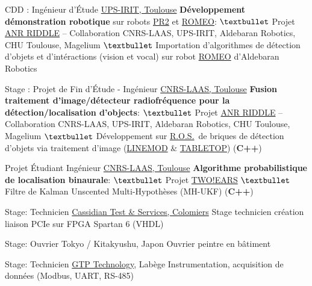 \documentclass[
	a4paper,
]{fortysecondscv}
\newcommand{\ros}{\href{http://www.ros.org/}{R.O.S.}}
\begin{document}
\begin{cvtable}[2]
  {CDD : Ingénieur d'Étude}
  {\href{https://www.irit.fr/?lang=fr}{UPS-IRIT, Toulouse}}
  {
    \textbf{Développement démonstration robotique} sur robots
    \href{http://www.willowgarage.com/pages/pr2/overview}{PR2} et
    \href{https://spectrum.ieee.org/automaton/robotics/humanoids/aldebaran-robotics-introduces-romeo-finally}{ROMEO}:\newline
    $\textbullet$ Projet
    \href{http://www.agence-nationale-recherche.fr/Project-ANR-12-CORD-0003}{ANR
      RIDDLE} -- Collaboration CNRS-LAAS, UPS-IRIT, Aldebaran Robotics, CHU
    Toulouse, Magelium\newline
    $\textbullet$ Importation d'algorithmes de détection d'objets et d'intéractions (vision
    et vocal) sur robot \href{https://spectrum.ieee.org/automaton/robotics/humanoids/aldebaran-robotics-introduces-romeo-finally}{ROMEO}
    d'Aldebaran Robotics
  }

  {Stage : Projet de Fin d'Étude - Ingénieur}
  {\href{https://www.laas.fr/public/fr}{CNRS-LAAS, Toulouse}}
  {
    \textbf{Fusion traitement d'image/détecteur radiofréquence pour la
      détection/localisation d'objects}:\newline
    $\textbullet$ Projet
    \href{http://www.agence-nationale-recherche.fr/Project-ANR-12-CORD-0003}{ANR
      RIDDLE} -- Collaboration CNRS-LAAS, UPS-IRIT, Aldebaran Robotics, CHU
    Toulouse, Magelium\newline
    $\textbullet$ Développement sur \ros\ de briques de détection d'objets via
    traitement d'image
    (\href{http://www.stefan-hinterstoisser.com/papers/hinterstoisser2011linemod.pdf}{LINEMOD} 
    \& \href{http://wiki.ros.org/tabletop_object_detector}{TABLETOP}) (\textbf{C++})
  }

  {Projet Étudiant Ingénieur}
  {\href{https://www.laas.fr/public/fr}{CNRS-LAAS, Toulouse}}
  {
    \textbf{Algorithme probabilistique de localisation binaurale}:\newline
    $\textbullet$ Projet \href{http://twoears.eu/}{TWO!EARS}\newline
    $\textbullet$ Filtre de Kalman Unscented Multi-Hypothèses (MH-UKF)
    (\textbf{C++})
  }

  {Stage: Technicien}
  {\href{http://www.spherea.com/fr}{Cassidian Test \& Services, Colomiers}}
  {
    Stage technicien création liaison PCIe sur FPGA Spartan 6 (VHDL)
  }

  {Stage: Ouvrier}
  {Tokyo / Kitakyushu, Japon}
  {
    Ouvrier peintre en bâtiment
  }

  {Stage: Technicien}
  {\href{https://www.gtptech.com/}{GTP Technology}, Labège}
  {
    Instrumentation, acquisition de données (Modbus, UART, RS-485)    
  }
\end{cvtable}



\cvsignature
\end{document}
